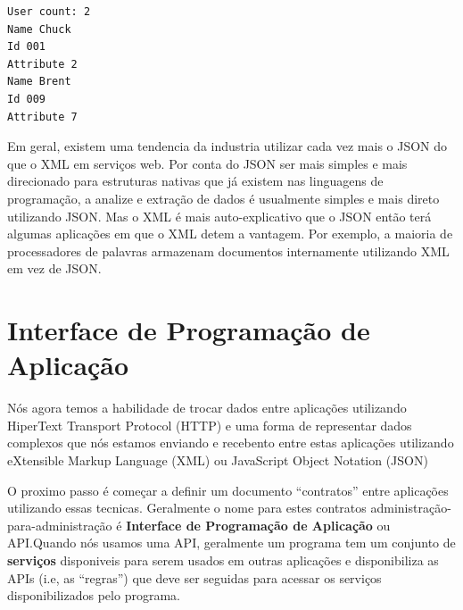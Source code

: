 \beforeverb
\begin{verbatim}
User count: 2
Name Chuck
Id 001
Attribute 2
Name Brent
Id 009
Attribute 7
\end{verbatim}
\afterverb
%
Em geral, existem uma tendencia da industria utilizar cada vez mais o JSON
do que o XML em serviços web. Por conta do JSON ser mais simples e mais
direcionado para estruturas nativas que já existem nas linguagens de
programação, a analize e extração de dados é usualmente simples e mais direto
utilizando JSON. Mas o XML é mais auto-explicativo que o JSON então terá
algumas aplicações em que o XML detem a vantagem. Por exemplo, a maioria de 
processadores de palavras armazenam documentos internamente utilizando XML
em vez de JSON.

\section{Interface de Programação de Aplicação}

Nós agora temos a habilidade de trocar dados entre aplicações utilizando 
HiperText Transport Protocol (HTTP) e uma forma de representar dados complexos
que nós estamos enviando e recebento entre estas aplicações utilizando 
eXtensible Markup Language (XML) ou JavaScript Object Notation (JSON)

O proximo passo é começar a definir um documento ``contratos'' entre
aplicações utilizando essas tecnicas. Geralmente o nome para estes contratos
administração-para-administração é {\bf Interface de Programação de 
Aplicação} ou API.Quando nós usamos uma API, geralmente um programa tem 
um conjunto de {\bf serviços} disponiveis para serem usados em outras
aplicações e disponibiliza as APIs (i.e, as ``regras'') que deve ser
seguidas para acessar os serviços disponibilizados pelo programa.

